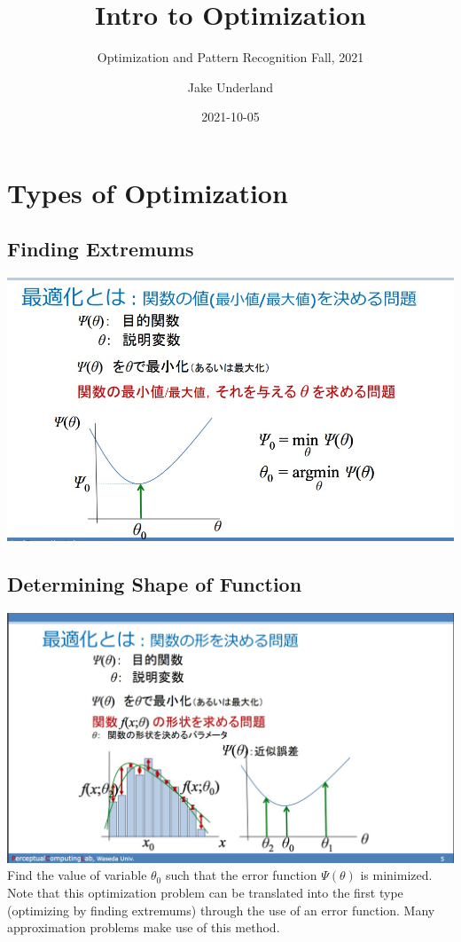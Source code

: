 \documentclass[
]{article}
\title{Intro to Optimization}
\subtitle{Optimization and Pattern Recognition Fall, 2021}
\author{Jake Underland}
\date{2021-10-05}
\begin{document}
\maketitle

{
\setcounter{tocdepth}{3}
\tableofcontents
}
\hypertarget{types-of-optimization}{%
\section{Types of Optimization}\label{types-of-optimization}}

\hypertarget{finding-extremums}{%
\subsection{Finding Extremums}\label{finding-extremums}}

\includegraphics[width=\textwidth,height=0.4\textheight]{1.jpg}

\hypertarget{determining-shape-of-function}{%
\subsection{Determining Shape of
Function}\label{determining-shape-of-function}}

\includegraphics[width=\textwidth,height=0.4\textheight]{2.jpg} Find the
value of variable \(\theta_0\) such that the error function
\(\Psi(\theta)\) is minimized. Note that this optimization problem can
be translated into the first type (optimizing by finding extremums)
through the use of an error function. Many approximation problems make
use of this method.
\end{document}
